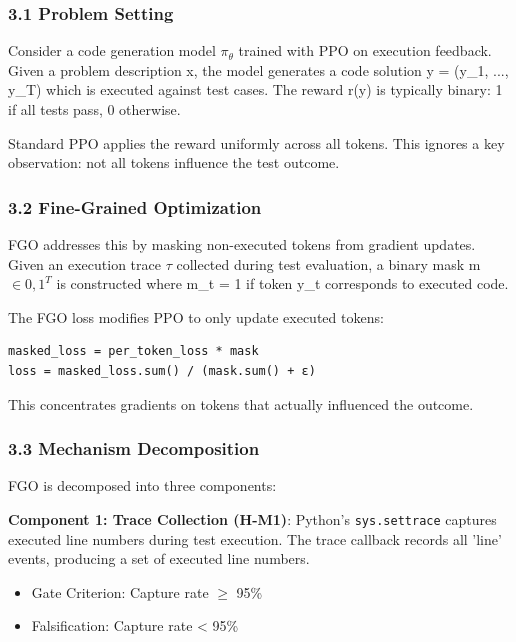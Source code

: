 
\subsubsection{3.1 Problem Setting}

Consider a code generation model $\pi _\theta$ trained with PPO on execution feedback. Given a problem description x, the model generates a code solution y = (y\_1, ..., y\_T) which is executed against test cases. The reward r(y) is typically binary: 1 if all tests pass, 0 otherwise.

Standard PPO applies the reward uniformly across all tokens. This ignores a key observation: not all tokens influence the test outcome.

\subsubsection{3.2 Fine-Grained Optimization}

FGO addresses this by masking non-executed tokens from gradient updates. Given an execution trace $\tau$ collected during test evaluation, a binary mask m $\in {0, 1}^T$ is constructed where m\_t = 1 if token y\_t corresponds to executed code.

The FGO loss modifies PPO to only update executed tokens:

\begin{verbatim}
masked_loss = per_token_loss * mask
loss = masked_loss.sum() / (mask.sum() + ε)
\end{verbatim}

This concentrates gradients on tokens that actually influenced the outcome.

\subsubsection{3.3 Mechanism Decomposition}

FGO is decomposed into three components:

\textbf{Component 1: Trace Collection (H-M1)}: Python's \texttt{sys.settrace} captures executed line numbers during test execution. The trace callback records all 'line' events, producing a set of executed line numbers.

\begin{itemize}
\item Gate Criterion: Capture rate $\geq$ 95\%
\item Falsification: Capture rate < 95\%
\end{itemize}

